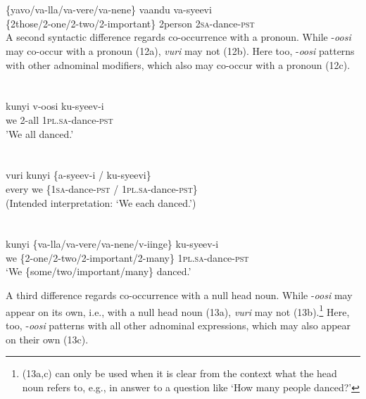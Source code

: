 \documentclass[output=paper]{langsci/langscibook}
\begin{document}
\chapter{}
\gll *\{yavo/va-lla/va-vere/va-nene\}  vaandu   va-syeevi\\
     \{2those/2-one/2-two/2-important\}  2person  2\textsc{sa}{}-dance-\textsc{pst}\\
  A second syntactic difference regards co-occurrence with a pronoun. While -\textit{oosi} may co-occur with a pronoun (12a), \textit{vuri} may not (12b). Here too, -\textit{oosi} patterns with other adnominal modifiers, which also may co-occur with a pronoun (12c).

\chapter[  ]{\textit{  }}
\chapter{}
\gll kunyi  v-oosi    ku-syeev-i      \\
     we  2-all    1\textsc{pl}.\textsc{sa}{}-dance-\textsc{pst}\\
\glt 'We all danced.'
\z

\chapter{}
\gll *vuri  kunyi    \{a-syeev-i / ku-syeevi\}  \\
     every  we    \{1\textsc{sa}{}-dance-\textsc{pst / }1\textsc{pl}.\textsc{sa}{}-dance-\textsc{pst\}}\\
\glt (Intended interpretation: ‘We each danced.’)
\z

\chapter[]{\scshape }
\gll kunyi \{va-lla/va-vere/va-nene/v-iinge\}     ku-syeev-i\\
     we    \{2-one/2-two/2-important/2-many\} 1\textsc{pl}.\textsc{sa}{}-dance-\textsc{pst}\\
\glt ‘We \{some/two/important/many\} danced.’
\z

  A third difference regards co-occurrence with a null head noun. While -\textit{oosi} may appear on its own, i.e., with a null head noun (13a), \textit{vuri} may not (13b).\footnote{ (13a,c) can only be used when it is clear from the context what the head noun refers to, e.g., in answer to a question like ‘How many people danced?’
} Here, too, -\textit{oosi} patterns with all other adnominal expressions, which may also appear on their own (13c).
\end{document}
